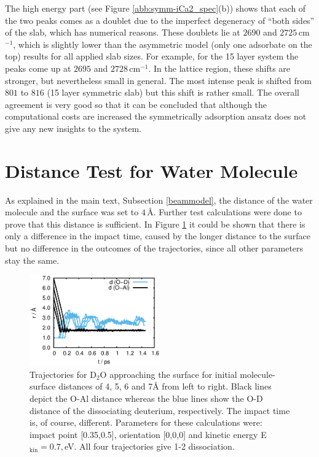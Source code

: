\documentclass[11pt,DIV=13,BCOR=5mm,a4paper,headinclude]{scrbook}
\begin{document}
The high energy part (see Figure \ref{abb:symm-iCa2_spec}(b)) shows that each of the two peaks comes as a doublet due to the imperfect degeneracy of ``both sides'' of the slab, which has numerical reasons.
These doublets lie at $2690$ and $2725\,$cm$^{-1}$, which is slightly lower than the asymmetric model (only one adsorbate on the top) results for all applied slab sizes.
For example, for the 15 layer system the peaks come up at $2695$ and $2728\,$cm$^{-1}$.
In the lattice region, these shifts are stronger, but nevertheless small in general.
The most intense peak is shifted from $801$ to $816$ (15 layer symmetric slab) but this shift is rather small.
The overall agreement is very good so that it can be concluded that although the computational costs are increased the symmetrically adsorption ansatz does not give any new insights to the system.
\\
\def\thefigure{C.\arabic{figure}}
\def\thetable{C.\arabic{table}}
\section{Distance Test for Water Molecule}\label{sec:disttest}
As explained in the main text, Subsection \ref{beammodel}, the distance of the water molecule and the surface was set to $4\,$\AA{}.
Further test calculations were done to prove that this distance is sufficient.
In Figure \ref{abb:MBS-dist} it could be shown that there is only a difference in the impact time, caused by the longer distance to the surface but no difference in the outcomes of the trajectories, since all other parameters stay the same.
 \begin{figure}[!h]
    \centering
    \includegraphics[width=0.5\textwidth]{figures/11-20/MD_all.eps}
  \caption{Trajectories for D$_2$O approaching the surface for initial molecule-surface distances of 4, 5, 6 and 7\AA{} from left to right.
Black lines depict the O-Al distance whereas the blue lines show the O-D distance of the dissociating deuterium, respectively.
The impact time is, of course, different.
Parameters for these calculations were: impact point [0.35,0.5], orientation [0,0,0] and kinetic energy E$_\textrm{kin}=0.7,$eV.
All four trajectories give 1-2 dissociation.}
  \label{abb:MBS-dist}
 \end{figure}
\\
\def\thefigure{D.\arabic{figure}}
\def\thetable{D.\arabic{table}}
\end{document}
